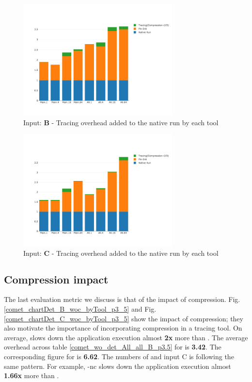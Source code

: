 \begin{figure}[!t]
\centering
\includegraphics[width=3.2in]{figs.comet.newMed/comet_chartDet_B_wc_byTool_p3_5.png}
\caption{ Input: \textbf{B} - Tracing overhead added to the native run by each tool}
\label{comet_chartDet_B_wc_byTool_p3_5}
\end{figure}


\begin{figure}[!t]
\centering
\includegraphics[width=3.2in]{figs.comet.newMed/comet_chartDet_C_wc_byTool_p3_5.png}
\caption{ Input: \textbf{C} - Tracing overhead added to the native run by each tool
}
\label{comet_chartDet_C_wc_byTool_p3_5}
\end{figure}


\subsection{Compression impact} 
\label{subsec:compact}

The last evaluation metric we discuss is that of the impact of compression.
%
Fig. \ref{comet_chartDet_B_woc_byTool_p3_5} and Fig. \ref{comet_chartDet_C_woc_byTool_p3_5} show the 
impact of compression; they also motivate the importance of incorporating compression in a tracing
tool. 
%
On average, \parlotnc slows down the application execution almost \textbf{2x} more than \parlota. 
%
The average overhead 
across table \ref{comet_wo_det_All_all_B_p3.5} for \parlota is \textbf{3.42}.
%
The  corresponding figure for \parlotnc is \textbf{6.62}. 
%
The numbers of \parlotm and input C is following the same pattern. For example, \parlot-nc slows down the application execution almost \textbf{1.66x} more than \parlotm.


